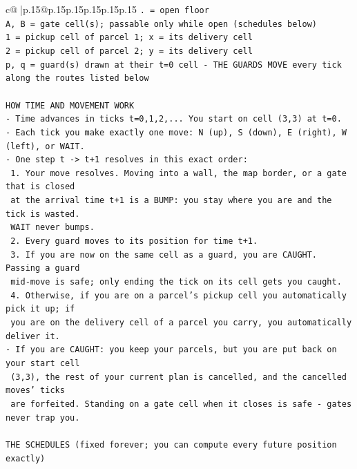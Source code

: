 \documentclass{article}
\begin{document}
{\begin{supertabular}{c@{$\;$}|p{.15\linewidth}@{}p{.15\linewidth}p{.15\linewidth}p{.15\linewidth}p{.15\linewidth}p{.15\linewidth}}
{{{\texttt{. = open floor} \\
\texttt{A, B = gate cell(s); passable only while open (schedules below)} \\
\texttt{1 = pickup cell of parcel 1; x = its delivery cell} \\
\texttt{2 = pickup cell of parcel 2; y = its delivery cell} \\
\texttt{p, q = guard(s) drawn at their t=0 cell {-} THE GUARDS MOVE every tick along the routes listed below} \\
\\ 
\texttt{HOW TIME AND MOVEMENT WORK} \\
\texttt{{-} Time advances in ticks t=0,1,2,... You start on cell (3,3) at t=0.} \\
\texttt{{-} Each tick you make exactly one move: N (up), S (down), E (right), W (left), or WAIT.} \\
\texttt{{-} One step t {-}> t+1 resolves in this exact order:} \\
\texttt{  1. Your move resolves. Moving into a wall, the map border, or a gate that is closed} \\
\texttt{     at the arrival time t+1 is a BUMP: you stay where you are and the tick is wasted.} \\
\texttt{     WAIT never bumps.} \\
\texttt{  2. Every guard moves to its position for time t+1.} \\
\texttt{  3. If you are now on the same cell as a guard, you are CAUGHT. Passing a guard} \\
\texttt{     mid{-}move is safe; only ending the tick on its cell gets you caught.} \\
\texttt{  4. Otherwise, if you are on a parcel's pickup cell you automatically pick it up; if} \\
\texttt{     you are on the delivery cell of a parcel you carry, you automatically deliver it.} \\
\texttt{{-} If you are CAUGHT: you keep your parcels, but you are put back on your start cell} \\
\texttt{  (3,3), the rest of your current plan is cancelled, and the cancelled moves' ticks} \\
\texttt{  are forfeited. Standing on a gate cell when it closes is safe {-} gates never trap you.} \\
\\ 
\texttt{THE SCHEDULES (fixed forever; you can compute every future position exactly)} \\
}}}
\end{supertabular}}
\end{document}
